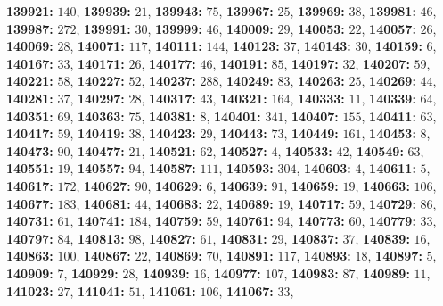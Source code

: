 \textsf{\bfseries 139921:} $140$, \textsf{\bfseries 139939:} $21$, \textsf{\bfseries 139943:} $75$, \textsf{\bfseries 139967:} $25$, \textsf{\bfseries 139969:} $38$, \textsf{\bfseries 139981:} $46$, \textsf{\bfseries 139987:} $272$, \textsf{\bfseries 139991:} $30$, \textsf{\bfseries 139999:} $46$, \textsf{\bfseries 140009:} $29$, \textsf{\bfseries 140053:} $22$, \textsf{\bfseries 140057:} $26$, \textsf{\bfseries 140069:} $28$, \textsf{\bfseries 140071:} $117$, \textsf{\bfseries 140111:} $144$, \textsf{\bfseries 140123:} $37$, \textsf{\bfseries 140143:} $30$, \textsf{\bfseries 140159:} $6$, \textsf{\bfseries 140167:} $33$, \textsf{\bfseries 140171:} $26$, \textsf{\bfseries 140177:} $46$, \textsf{\bfseries 140191:} $85$, \textsf{\bfseries 140197:} $32$, \textsf{\bfseries 140207:} $59$, \textsf{\bfseries 140221:} $58$, \textsf{\bfseries 140227:} $52$, \textsf{\bfseries 140237:} $288$, \textsf{\bfseries 140249:} $83$, \textsf{\bfseries 140263:} $25$, \textsf{\bfseries 140269:} $44$, \textsf{\bfseries 140281:} $37$, \textsf{\bfseries 140297:} $28$, \textsf{\bfseries 140317:} $43$, \textsf{\bfseries 140321:} $164$, \textsf{\bfseries 140333:} $11$, \textsf{\bfseries 140339:} $64$, \textsf{\bfseries 140351:} $69$, \textsf{\bfseries 140363:} $75$, \textsf{\bfseries 140381:} $8$, \textsf{\bfseries 140401:} $341$, \textsf{\bfseries 140407:} $155$, \textsf{\bfseries 140411:} $63$, \textsf{\bfseries 140417:} $59$, \textsf{\bfseries 140419:} $38$, \textsf{\bfseries 140423:} $29$, \textsf{\bfseries 140443:} $73$, \textsf{\bfseries 140449:} $161$, \textsf{\bfseries 140453:} $8$, \textsf{\bfseries 140473:} $90$, \textsf{\bfseries 140477:} $21$, \textsf{\bfseries 140521:} $62$, \textsf{\bfseries 140527:} $4$, \textsf{\bfseries 140533:} $42$, \textsf{\bfseries 140549:} $63$, \textsf{\bfseries 140551:} $19$, \textsf{\bfseries 140557:} $94$, \textsf{\bfseries 140587:} $111$, \textsf{\bfseries 140593:} $304$, \textsf{\bfseries 140603:} $4$, \textsf{\bfseries 140611:} $5$, \textsf{\bfseries 140617:} $172$, \textsf{\bfseries 140627:} $90$, \textsf{\bfseries 140629:} $6$, \textsf{\bfseries 140639:} $91$, \textsf{\bfseries 140659:} $19$, \textsf{\bfseries 140663:} $106$, \textsf{\bfseries 140677:} $183$, \textsf{\bfseries 140681:} $44$, \textsf{\bfseries 140683:} $22$, \textsf{\bfseries 140689:} $19$, \textsf{\bfseries 140717:} $59$, \textsf{\bfseries 140729:} $86$, \textsf{\bfseries 140731:} $61$, \textsf{\bfseries 140741:} $184$, \textsf{\bfseries 140759:} $59$, \textsf{\bfseries 140761:} $94$, \textsf{\bfseries 140773:} $60$, \textsf{\bfseries 140779:} $33$, \textsf{\bfseries 140797:} $84$, \textsf{\bfseries 140813:} $98$, \textsf{\bfseries 140827:} $61$, \textsf{\bfseries 140831:} $29$, \textsf{\bfseries 140837:} $37$, \textsf{\bfseries 140839:} $16$, \textsf{\bfseries 140863:} $100$, \textsf{\bfseries 140867:} $22$, \textsf{\bfseries 140869:} $70$, \textsf{\bfseries 140891:} $117$, \textsf{\bfseries 140893:} $18$, \textsf{\bfseries 140897:} $5$, \textsf{\bfseries 140909:} $7$, \textsf{\bfseries 140929:} $28$, \textsf{\bfseries 140939:} $16$, \textsf{\bfseries 140977:} $107$, \textsf{\bfseries 140983:} $87$, \textsf{\bfseries 140989:} $11$, \textsf{\bfseries 141023:} $27$, \textsf{\bfseries 141041:} $51$, \textsf{\bfseries 141061:} $106$, \textsf{\bfseries 141067:} $33$, 
